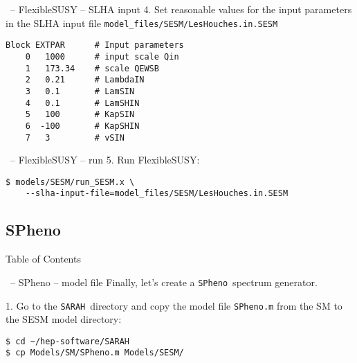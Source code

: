 \documentclass[11pt]{beamer}
\newcommand{\SARAH}{\texttt{SARAH}}
\newcommand{\SPheno}{\texttt{SPheno}}
\begin{document}

\begin{frame}[fragile]{\insertsection\ -- FlexibleSUSY -- SLHA input}
  4. Set reasonable values for the input parameters in the SLHA input
  file \texttt{model\_files/SESM/LesHouches.in.SESM}
  \begin{lstlisting}
Block EXTPAR      # Input parameters
    0   1000      # input scale Qin
    1   173.34    # scale QEWSB
    2   0.21      # LambdaIN
    3   0.1       # LamSIN
    4   0.1       # LamSHIN
    5   100       # KapSIN
    6  -100       # KapSHIN
    7   3         # vSIN\end{lstlisting}%
\end{frame}


\begin{frame}[fragile]{\insertsection\ -- FlexibleSUSY -- run}
  5. Run FlexibleSUSY:
  \begin{lstlisting}
$ models/SESM/run_SESM.x \
    --slha-input-file=model_files/SESM/LesHouches.in.SESM\end{lstlisting}%
\end{frame}


\subsection{SPheno}


\begin{frame}{Table of Contents}
\end{frame}


\begin{frame}[fragile]{\insertsection\ -- SPheno -- model file}
  Finally, let's create a \SPheno\ spectrum generator.

  \bigskip

  1. Go to the \SARAH\ directory and copy the model file
  \texttt{SPheno.m} from the SM to the SESM model directory:
  \begin{lstlisting}
$ cd ~/hep-software/SARAH
$ cp Models/SM/SPheno.m Models/SESM/\end{lstlisting}%
\end{frame}
\end{document}
